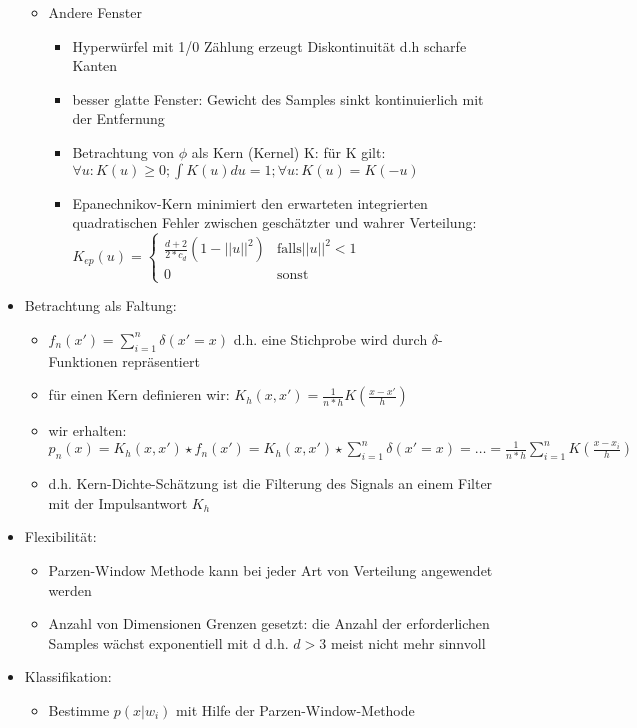 \documentclass{article} %
\begin{document}
\begin{itemize}
\begin{itemize}
			\item Andere Fenster
			\begin{itemize}
				\item Hyperwürfel mit 1/0 Zählung erzeugt Diskontinuität d.h scharfe Kanten
				\item besser glatte Fenster: Gewicht des Samples sinkt kontinuierlich mit der Entfernung
				\item Betrachtung von $\phi$ als Kern (Kernel) K: für K gilt: $\forall u: K(u) \geq 0; \int K(u) du = 1; \forall u: K(u) = K(-u)$
				\item Epanechnikov-Kern minimiert den erwarteten integrierten quadratischen Fehler zwischen geschätzter und wahrer Verteilung: $K_{ep}(u) = \begin{cases}
				\frac{d+2}{2*c_d}(1-||u||^2) & \text{falls} ||u||^2 < 1\\
				0 & \text{sonst}
				\end{cases}$
			\end{itemize}
		\end{itemize}
		\item Betrachtung als Faltung:
		\begin{itemize}
			\item $f_n(x') = \sum_{i=1}^{n} \delta(x'=x)$ d.h. eine Stichprobe wird durch $\delta$-Funktionen repräsentiert
			\item für einen Kern definieren wir: $K_h(x,x') = \frac{1}{n*h} K(\frac{x-x'}{h})$
			\item wir erhalten: $p_n(x) = K_h(x,x') \star f_n(x') = K_h(x,x') \star \sum_{i=1}^{n}\delta(x'=x) = \dots = \frac{1}{n*h}\sum_{i=1}^{n}K(\frac{x-x_i}{h})$
			\item d.h. Kern-Dichte-Schätzung ist die Filterung des Signals an einem Filter mit der Impulsantwort $K_h$  
		\end{itemize}
		\item Flexibilität:
		\begin{itemize}
			\item Parzen-Window Methode kann bei jeder Art von Verteilung angewendet werden
			\item Anzahl von Dimensionen Grenzen gesetzt: die Anzahl der erforderlichen Samples wächst exponentiell mit d d.h. $d > 3$ meist nicht mehr sinnvoll
		\end{itemize}
		\item Klassifikation:
		\begin{itemize}
			\item Bestimme $p(x|w_i)$ mit Hilfe der Parzen-Window-Methode

\end{itemize}
\end{itemize}
\end{document}

